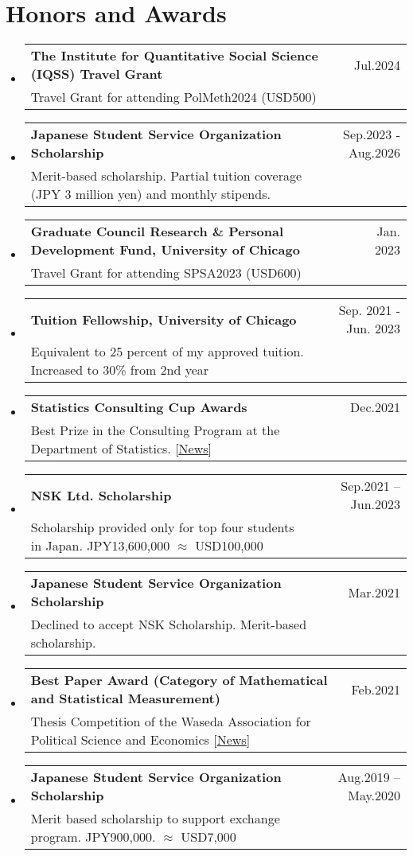 \documentclass[letterpaper,11pt]{article} %
\makeatletter
\newcommand{\CVSubheading}[4]{
  \vspace{-2pt}\item
    \begin{tabular*}{0.97\textwidth}[t]{l@{\extracolsep{\fill}}r}
      \textbf{#1} & #2 \\
      \small#3 & \small #4 \\
    \end{tabular*}\vspace{-7pt}
}
\newcommand{\CVSubHeadingListStart}{\begin{itemize}[leftmargin=0.5cm, label={}]}
\newcommand{\CVSubHeadingListEnd}{\end{itemize}}
\makeatother
\begin{document}
\section{Honors and Awards}
  \CVSubHeadingListStart
    \CVSubheading
      {The Institute for Quantitative Social Science (IQSS) Travel Grant}{Jul.2024}
      {Travel Grant for attending PolMeth2024 (USD500)}{}
    \CVSubheading
      {Japanese Student Service Organization Scholarship}{Sep.2023 - Aug.2026}
      {Merit-based scholarship. Partial tuition coverage (JPY 3 million yen) and monthly stipends.}{}
    \CVSubheading %
     {Graduate Council Research \& Personal Development Fund, University of Chicago}{Jan. 2023}
    {Travel Grant for attending SPSA2023 (USD600)}{}
    \CVSubheading
      {Tuition Fellowship, University of Chicago}
      {Sep. 2021 - Jun. 2023}
      {Equivalent to 25 percent of my approved tuition. Increased to 30\% from 2nd year}{}
    \CVSubheading
      {Statistics Consulting Cup Awards}{Dec.2021}
      {Best Prize in the Consulting Program at the Department of Statistics. 
      \textcolor{sanguria}{[\underline{\href{https://stat.uchicago.edu/news/article/the-fall-2021-consulting-cup-award/}{News}}]}
      }{}
    \CVSubheading
      {NSK Ltd. Scholarship}{Sep.2021 -- Jun.2023}
      {Scholarship provided only for top four students in Japan. JPY13,600,000 $\approx$ USD100,000}{}
    \CVSubheading
      {Japanese Student Service Organization Scholarship}{Mar.2021}
      {Declined to accept NSK Scholarship. Merit-based scholarship.}{}
    \CVSubheading
      {Best Paper Award (Category of Mathematical and Statistical Measurement)}{Feb.2021}
      {Thesis Competition of the Waseda Association for Political Science and Economics  \textcolor{sanguria}{[\underline{\href{https://www.waseda.jp/fpse/pse/news/2021/02/08/12784/}{News}}]}
      }{}
    \CVSubheading
      {Japanese Student Service Organization Scholarship}{Aug.2019 -- May.2020}
      {Merit based scholarship to support exchange program. JPY900,000. $\approx$ USD7,000}{}
  \CVSubHeadingListEnd
\end{document}
